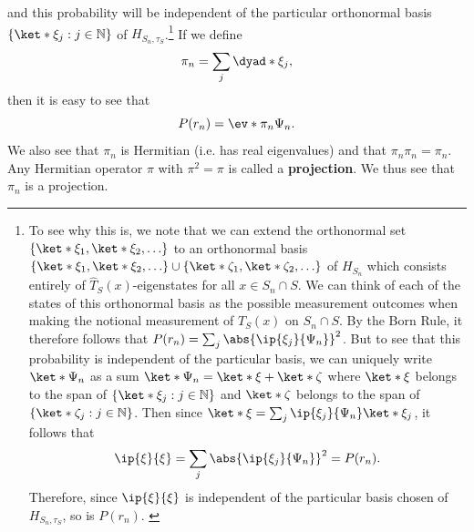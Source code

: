 \documentclass[12pt]{report}
\begin{document}
 and this probability will be independent of the particular orthonormal basis  $\{\ket*{\xi_j}:j\in\mathbb{N}\}$ of $H_{S_n,\tau_S}$.\footnote{To see why this is, we note that we can extend the orthonormal set $\{\ket*{\xi_1},\ket*{\xi_2},\ldots\}$ to an orthonormal basis  $\{\ket*{\xi_1},\ket*{\xi_2},\ldots\}\cup\{\ket*{\zeta_1},\ket*{\zeta_2},\ldots\}$ of $H_{S_n}$ which consists entirely of $\hat{T}_S(x)$-eigenstates for all $x\in S_n\cap S$. We can think of each of the states of this orthonormal basis as the possible measurement outcomes when making the notional measurement of $T_S(x)$ on $S_n\cap S$. By the Born Rule, it therefore follows that $P(r_n)=\sum_j \abs{ \ip{\xi_j}{\Psi_n}}^2$. But to see that this probability is independent of the particular basis, we can uniquely write $\ket*{\Psi_n}$ as a sum $\ket*{\Psi_n}=\ket*{\xi}+\ket*{\zeta}$ where $\ket*{\xi}$ belongs to the span of $\{\ket*{\xi_j}:j\in\mathbb{N}\}$ and $\ket*{\zeta}$ belongs to the span of $\{\ket*{\zeta_j}:j\in\mathbb{N}\}$.  Then since $\ket*{\xi}=\sum_j\ip{\xi_j}{\Psi_n}\ket*{\xi_j}$, it follows that $$\ip{\xi}{\xi}=\sum_j\abs{ \ip{\xi_j}{\Psi_n}}^2=P(r_n).$$ Therefore, since  $\ip{\xi}{\xi}$ is independent of the particular basis chosen of $H_{S_n,\tau_S}$, so is $P(r_n)$.  \label{priproof} } If we define 
\begin{equation}\label{tauprojection}
\pi_n=\sum_j\dyad*{\xi_j},
\end{equation}%
%
then it is easy to see that
\begin{equation}\label{Prn}
	P(r_n)=\ev*{\pi_n}{\Psi_n}.
\end{equation}
We also see that $\pi_n$ is Hermitian (i.e. has real eigenvalues) and that $\pi_n \pi_n = \pi_n$. Any Hermitian operator $\pi$ with $\pi^2=\pi$ is called a \textbf{projection}. We thus see that $\pi_n$ is a projection.
\end{document}
